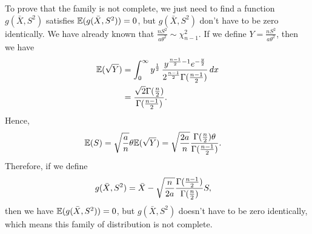 \documentclass{article}
\begin{document}
\begin{CJK}{UTF8}{gbsn}
\begin{itemize}
              To prove that the family is not complete, we just need to find a function $g(\bar{X}, S^2)$ satisfies
              ${\mathbb E}(g(\bar{X}, S^2)) = 0$, but $g(\bar{X}, S^2)$ don't have to be zero identically.
              We have already known that $\frac{nS^2}{a\theta^2} \sim \chi_{n-1}^2$. If we define $Y = \frac{nS^2}{a\theta^2}$,
              then we have
              \begin{align}
                  {\mathbb E}(\sqrt{Y}) & = \int_{0}^{\infty} y^{\frac{1}{2}} \, \frac{y^{\frac{n-1}{2}-1}e^{-\frac{y}{2}}}{2^{\frac{n-1}{2}}\Gamma(\frac{n-1}{2})}\, dx \notag \\
                                & =\frac{\sqrt{2} \Gamma(\frac{n}{2})}{\Gamma(\frac{n-1}{2})}.\notag
              \end{align}
              Hence,
              \begin{align}
                  {\mathbb E}(S) & = \sqrt{\frac{a}{n}}\theta {\mathbb E}(\sqrt{Y}) = \sqrt{\frac{2a}{n}}\frac{\Gamma(\frac{n}{2})\theta }{\Gamma(\frac{n-1}{2})}.\notag
              \end{align}
              Therefore, if we define
              \begin{align}
                  g(\bar{X}, S^2) & = \bar{X} - \sqrt{\frac{n}{2a}} \frac{\Gamma(\frac{n-1}{2})}{\Gamma(\frac{n}{2})}S ,\notag
              \end{align}
              then we have ${\mathbb E}(g(\bar{X}, S^2)) = 0$, but $g(\bar{X}, S^2)$ doesn't have to be zero identically, which
              means this family of distribution is not complete.
    \end{itemize}




\end{CJK}
\end{document}
